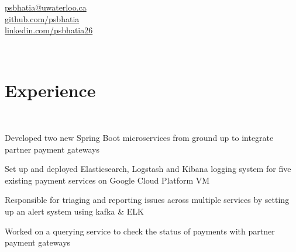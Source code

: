\documentclass[]{hieudo-build}
\begin{document}
%
%
\color{myyellow}
{
	\color{myblue}\faEnvelope \href{mailto:psbhatia@uwaterloo.ca}{ psbhatia@uwaterloo.ca}\\
	\faGithub \href{https://github.com/psbhatia}{   github.com/psbhatia}\\
	\faLinkedinSquare \href{https://www.linkedin.com/in/psbhatia26}{   linkedin.com/psbhatia26}
}

\begin{minipage}[t]{1.0\textwidth} 

\\
\color{myyellow}
\vspace{0.9em} %



\section{Experience}

\\
\color{myyellow}
\begin{tightemize}
\item Developed two new Spring Boot microservices from ground up to integrate partner payment gateways 
\item Set up and deployed Elasticsearch, Logstash and Kibana logging system for five existing payment services on Google Cloud Platform VM
\item Responsible for triaging and reporting issues across multiple services by setting up an alert system using kafka \& ELK
\item Worked on a querying service to check the status of payments with partner payment gateways
\end{tightemize}
\sectionsep


\end{minipage}
\end{document}
